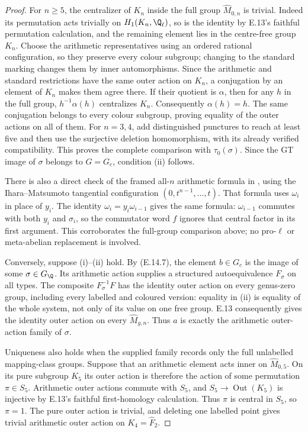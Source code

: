 \begin{proof}
For $n\ge5$, the centralizer of $K_n$ inside the full group
$\widehat M_{0,n}$ is trivial. Indeed its permutation acts trivially
on $H_1(K_n,\Q_\ell)$, so is the identity by E.13's faithful
permutation calculation, and the remaining element lies in the
centre-free group $K_n$. Choose the arithmetic representatives using
an ordered rational configuration, so they preserve every colour
subgroup; changing to the standard marking changes them by inner
automorphisms. Since the arithmetic and standard restrictions have the
same outer action on $K_n$, a conjugation by an element of $K_n$
makes them agree there. If their quotient is $\alpha$, then for any
$h$ in the full group, $h^{-1}\alpha(h)$ centralizes $K_n$.
Consequently $\alpha(h)=h$. The same conjugation belongs to every
colour subgroup, proving equality of the outer actions on all of them.
For $n=3,4$, add distinguished punctures to reach at least five and
then use the surjective deletion homomorphism, with its already
verified compatibility. This proves the complete comparison with
$\tau_0(\sigma)$. Since the GT image of $\sigma$ belongs to
$G=G_c$, condition (ii) follows.

There is also a direct check of the framed all-$n$ arithmetic formula
in \citet[\S5.4, equation~(5.4.2), printed p.~28]{E_Nakamura2010},
using the Ihara--Matsumoto tangential configuration
$(0,t^{n-1},\ldots,t)$. That formula uses $\omega_i$ in place of
$y_i$. The identity $\omega_i=y_i\omega_{i-1}$ gives the same
formula: $\omega_{i-1}$ commutes with both $y_i$ and $\sigma_i$,
so the commutator word $f$ ignores that central factor in its first
argument. This corroborates the full-group comparison above; no
pro-$\ell$ or meta-abelian replacement is involved.

Conversely, suppose (i)--(ii) hold. By (E.14.7), the element
$b\in G_c$ is the image of some $\sigma\in G_\Q$. Its arithmetic
action supplies a structured autoequivalence $F_\sigma$ on all
types. The composite $F_\sigma^{-1}F$ has the identity outer action
on every genus-zero group, including every labelled and coloured
version: equality in (ii) is equality of the whole system, not only
of its value on one free group. E.13 consequently gives the identity
outer action on every $\widehat M_{g,n}$. Thus $a$ is exactly the
arithmetic outer-action family of $\sigma$.

Uniqueness also holds when the supplied family records only the full
unlabelled mapping-class groups. Suppose that an arithmetic element
acts inner on $\widehat M_{0,5}$. On its pure subgroup $K_5$ its
outer action is therefore the action of some permutation
$\pi\in S_5$. Arithmetic outer actions commute with $S_5$, and
$S_5\to\operatorname{Out}(K_5)$ is injective by E.13's faithful
first-homology calculation. Thus $\pi$ is central in $S_5$, so
$\pi=1$. The pure outer action is trivial, and deleting one labelled
point gives trivial arithmetic outer action on
$K_4=\widehat F_2$.


\end{proof}
